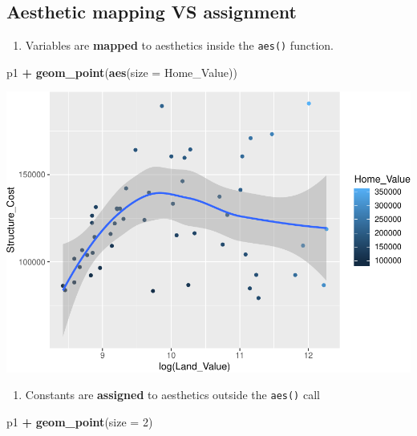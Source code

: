 \documentclass[
]{book}
\newenvironment{Shaded}{\begin{snugshade}}{\end{snugshade}}
\newcommand{\DataTypeTok}[1]{\textcolor[rgb]{0.13,0.29,0.53}{#1}}
\newcommand{\DecValTok}[1]{\textcolor[rgb]{0.00,0.00,0.81}{#1}}
\newcommand{\KeywordTok}[1]{\textcolor[rgb]{0.13,0.29,0.53}{\textbf{#1}}}
\newcommand{\NormalTok}[1]{#1}
\newcommand{\OperatorTok}[1]{\textcolor[rgb]{0.81,0.36,0.00}{\textbf{#1}}}
\newcommand{\StringTok}[1]{\textcolor[rgb]{0.31,0.60,0.02}{#1}}
\providecommand{\tightlist}{%
  \setlength{\itemsep}{0pt}\setlength{\parskip}{0pt}}
\begin{document}
\hypertarget{aesthetic-mapping-vs-assignment}{%
\subsection{Aesthetic mapping VS assignment}\label{aesthetic-mapping-vs-assignment}}

\begin{enumerate}
\def\labelenumi{\arabic{enumi}.}
\tightlist
\item
  Variables are \textbf{mapped} to aesthetics inside the \texttt{aes()} function.
\end{enumerate}

\begin{Shaded}
\begin{Highlighting}[]
\NormalTok{p1 }\OperatorTok{+}
\StringTok{  }\KeywordTok{geom\_point}\NormalTok{(}\KeywordTok{aes}\NormalTok{(}\DataTypeTok{size =}\NormalTok{ Home\_Value))}
\end{Highlighting}
\end{Shaded}

\includegraphics{R/Rgraphics/figures/unnamed-chunk-149-1.pdf}

\begin{enumerate}
\def\labelenumi{\arabic{enumi}.}
\setcounter{enumi}{1}
\tightlist
\item
  Constants are \textbf{assigned} to aesthetics outside the \texttt{aes()} call
\end{enumerate}

\begin{Shaded}
\begin{Highlighting}[]
\NormalTok{p1 }\OperatorTok{+}
\StringTok{  }\KeywordTok{geom\_point}\NormalTok{(}\DataTypeTok{size =} \DecValTok{2}\NormalTok{)}
\end{Highlighting}
\end{Shaded}
\end{document}
